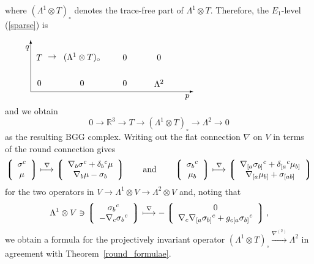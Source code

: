 \documentclass[pdftex]{sigma}
\begin{document}
where $(\Lambda^1\otimes T)_\circ$ denotes the trace-free part of
$\Lambda^1\otimes T$. Therefore, the $E_1$-level (\ref{sparse}) is
\[\begin{picture}(300,70)(0,15)
\put(0,20){\vector(1,0){190}}
\put(0,20){\vector(0,1){60}}
\put(183,14){\makebox(0,0){$p$}}
\put(-4,71){\makebox(0,0){$q$}}
\put(10,60){\makebox(0,0){$T$}}
\put(25,60){\makebox(0,0){$\to$}}
\put(60,60){\makebox(0,0){$(\Lambda^1\otimes T)_\circ$}}
\put(110,60){\makebox(0,0){$0$}}
\put(150,60){\makebox(0,0){$0$}}
\put(10,30){\makebox(0,0){$0$}}
\put(60,30){\makebox(0,0){$0$}}
\put(110,30){\makebox(0,0){$0$}}
\put(150,30){\makebox(0,0){$\Lambda^2$}}
\end{picture}\]
and we obtain
\[0\to{\mathbb{R}}^3
\to T\to (\Lambda^1\otimes T)_\circ\to \Lambda^2\to 0\]
as the resulting BGG complex. Writing out the f\/lat connection $\nabla$ on
$V$ in terms of the round connection gives
\[\left\lgroup\begin{array}c\sigma^c\\ \mu\end{array}\right\rgroup
\stackrel{\nabla}{\longmapsto}
\left\lgroup\begin{array}c\nabla_b\sigma^c+\delta_b{}^c\mu\\
\nabla_b\mu-\sigma_b\end{array}\right\rgroup\qquad\mbox{and}\qquad
\left\lgroup\begin{array}c\sigma_b{}^c\\ \mu_b\end{array}\right\rgroup
\stackrel{\nabla}{\longmapsto}
\left\lgroup\begin{array}c\nabla_{[a}\sigma_{b]}{}^c+\delta_{[a}{}^c\mu_{b]}\\
\nabla_{[a}\mu_{b]}+\sigma_{[ab]}\end{array}\right\rgroup\]
for the two operators in $V\to\Lambda^1\otimes V\to\Lambda^2\otimes V$ and,
noting that
\[\Lambda^1\otimes V\ni\left\lgroup\begin{array}c\sigma_b{}^c\\
-\nabla_c\sigma_b{}^c\end{array}\right\rgroup
\stackrel{\nabla}{\longmapsto}
-\left\lgroup\begin{array}c0\\
\nabla_{c}\nabla_{[a}\sigma_{b]}{}^c+g_{c[a}\sigma_{b]}{}^c
\end{array}\right\rgroup,\]
we obtain a formula for the projectively invariant operator
$(\Lambda^1\otimes T)_\circ\stackrel{\nabla^{(2)}}{\longrightarrow}\Lambda^2$
in agreement with Theorem~\ref{round_formulae}.
\end{document}
